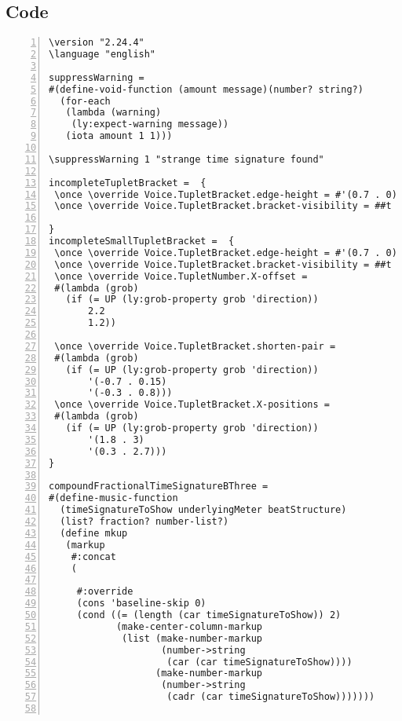 \subsection{Code}
\begin{Verbatim}[numbers=left,xleftmargin=5mm]
\version "2.24.4"
\language "english"

suppressWarning =
#(define-void-function (amount message)(number? string?)
  (for-each
   (lambda (warning)
    (ly:expect-warning message))
   (iota amount 1 1)))

\suppressWarning 1 "strange time signature found"

incompleteTupletBracket =  {
 \once \override Voice.TupletBracket.edge-height = #'(0.7 . 0)
 \once \override Voice.TupletBracket.bracket-visibility = ##t

}
incompleteSmallTupletBracket =  {
 \once \override Voice.TupletBracket.edge-height = #'(0.7 . 0)
 \once \override Voice.TupletBracket.bracket-visibility = ##t
 \once \override Voice.TupletNumber.X-offset =
 #(lambda (grob)
   (if (= UP (ly:grob-property grob 'direction))
       2.2
       1.2))

 \once \override Voice.TupletBracket.shorten-pair =
 #(lambda (grob)
   (if (= UP (ly:grob-property grob 'direction))
       '(-0.7 . 0.15)
       '(-0.3 . 0.8)))
 \once \override Voice.TupletBracket.X-positions =
 #(lambda (grob)
   (if (= UP (ly:grob-property grob 'direction))
       '(1.8 . 3)
       '(0.3 . 2.7)))
}

compoundFractionalTimeSignatureBThree =
#(define-music-function
  (timeSignatureToShow underlyingMeter beatStructure)
  (list? fraction? number-list?)
  (define mkup
   (markup
    #:concat
    (

     #:override
     (cons 'baseline-skip 0)
     (cond ((= (length (car timeSignatureToShow)) 2)
            (make-center-column-markup
             (list (make-number-markup
                    (number->string
                     (car (car timeSignatureToShow))))
                   (make-number-markup
                    (number->string
                     (cadr (car timeSignatureToShow)))))))


\end{Verbatim}
